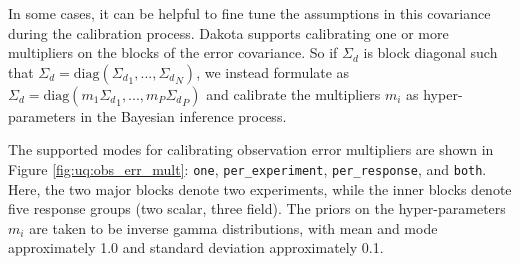 In some cases, it can be helpful to fine tune the assumptions in this
covariance during the calibration process.  Dakota supports
calibrating one or more multipliers on the blocks of the error
covariance.  So if $\Sigma_d$ is block diagonal such that $\Sigma_d =
\mbox{diag}({\Sigma_d}_1, ..., {\Sigma_d}_N)$, we instead formulate as
$\Sigma_d = \mbox{diag}(m_1{\Sigma_d}_1, ..., m_P{\Sigma_d}_P)$ and
calibrate the multipliers $m_i$ as hyper-parameters in the Bayesian
inference process.

The supported modes for calibrating observation error multipliers are
shown in Figure \ref{fig:uq:obs_err_mult}: \texttt{one},
\texttt{per\_experiment}, \texttt{per\_response}, and \texttt{both}.
Here, the two major blocks denote two experiments, while the inner
blocks denote five response groups (two scalar, three field).  The
priors on the hyper-parameters $m_i$ are taken to be inverse gamma
distributions, with mean and mode approximately 1.0 and standard
deviation approximately 0.1.

